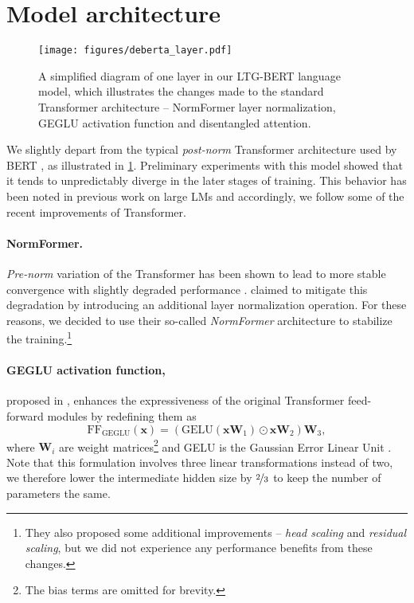     \section{Model architecture}
    \label{sec:architecture}
    
    
    \begin{figure}[t]
        \centering
        \texttt{[image: figures/deberta\_layer.pdf]}
        \caption{A simplified diagram of one layer in our LTG-BERT language model, which illustrates the changes made to the standard Transformer architecture -- NormFormer layer normalization, GEGLU activation function and disentangled attention.}
        \label{fig:architecture}
    \end{figure}
    
    We slightly depart from the typical \textit{post-norm} Transformer architecture \citep{NIPS2017_3f5ee243} used by BERT \citep{devlin-etal-2019-bert}, as illustrated in \cref{fig:architecture}. Preliminary experiments with this model showed that it tends to unpredictably diverge in the later stages of training. This behavior has been noted in previous work on large LMs \citep{liu-etal-2020-understanding} and accordingly, we follow some of the recent improvements of Transformer.
    
    \paragraph{NormFormer.} \textit{Pre-norm} variation of the Transformer has been shown to lead to more stable convergence with slightly degraded performance \citep{nguyen-salazar-2019-transformers}.  claimed to mitigate this degradation by introducing an additional layer normalization operation. For these reasons, we decided to use their so-called \textit{NormFormer} architecture to stabilize the training.\footnote{They also proposed some additional improvements -- \textit{head scaling} and \textit{residual scaling}, but we did not experience any performance benefits from these changes.}
    
    \paragraph{GEGLU activation function,} proposed in , enhances the expressiveness of the original Transformer feed-forward modules by redefining them as
    $$\textrm{FF}_{\textrm{GEGLU}}(\bm{x}) = \left(\textrm{GELU}(\bm{xW}_1) \odot \bm{xW}_2\right)\bm{W}_3,$$ where $\bm{W}_i$ are weight matrices\footnote{The bias terms are omitted for brevity.} and GELU is the Gaussian Error Linear Unit \citep{Hendrycks2016}. Note that this formulation involves three linear transformations instead of two, we therefore lower the intermediate hidden size by $\nicefrac{2}{3}$ to keep the number of parameters the same.
    
